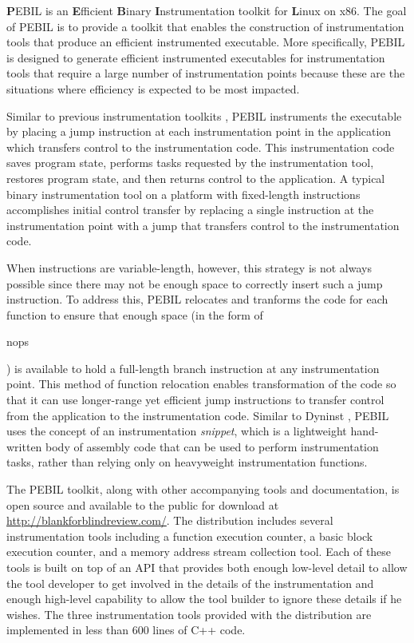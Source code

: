 \textbf{P}EBIL is an \textbf{E}fficient
\textbf{B}inary \textbf{I}nstrumentation toolkit for \textbf{L}inux on
x86. The goal of PEBIL is to provide a toolkit that
enables the construction of instrumentation tools that produce an efficient
instrumented executable. More specifically, PEBIL is designed to generate
efficient instrumented executables for instrumentation tools that require a
large number of instrumentation points because these are the situations where
efficiency is expected to be most impacted. 

Similar to previous instrumentation
toolkits \cite{buck2000api}, PEBIL instruments the executable by placing a jump
instruction at each instrumentation point in the application which transfers
control to the instrumentation code. This instrumentation code saves program
state, performs tasks requested by the instrumentation tool, restores program
state, and then returns control to the application. A typical binary
instrumentation tool on a platform with fixed-length instructions
\cite{tikir2006pmac} accomplishes initial control transfer by replacing a single
instruction at the instrumentation point with a jump that transfers control to
the instrumentation code. 

When instructions are variable-length, however, this strategy is not always
possible since there may not be enough space to correctly insert such a jump
instruction. To address this, PEBIL relocates and tranforms the code for each
function to ensure that enough space (in the form of \begin{it}nops\end{it}) is
available to hold a full-length branch instruction at any instrumentation
point. This method of function relocation enables transformation of the code so
that it can use longer-range yet efficient jump instructions to transfer control
from the application to the instrumentation code. Similar to Dyninst
\cite{buck2000api}, PEBIL uses the concept of an instrumentation
\textit{snippet}, which is a lightweight hand-written body of assembly code that
can be used to perform instrumentation tasks, rather than relying only on
heavyweight instrumentation functions.

The PEBIL toolkit, along with other accompanying tools and documentation, is
open source and available to the public for download at
\url{http://blankforblindreview.com/}. The distribution includes
several instrumentation tools including a function execution counter, a basic
block execution counter, and a memory address stream collection tool. Each of
these tools is built on top of an API that provides both enough low-level detail
to allow the tool developer to get involved in the details of the
instrumentation and enough high-level capability to allow the tool builder to
ignore these details if he wishes. The three instrumentation tools provided with
the distribution are implemented in less than 600 lines of C++ code. 

